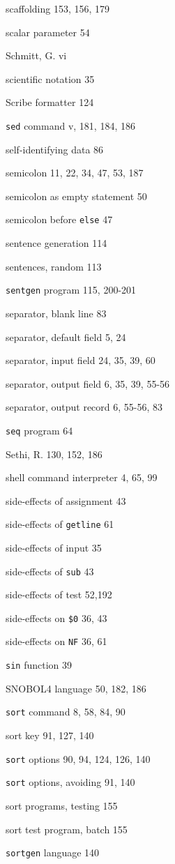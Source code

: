 \begin{multicols}{3}
scaffolding 153, 156, 179

scalar parameter 54

Schmitt, G. vi

scientific notation 35

Scribe formatter 124

\verb'sed' command v, 181, 184, 186

self-identifying data 86

semicolon 11, 22, 34, 47, 53, 187

semicolon as empty statement 50

semicolon before \verb'else' 47

sentence generation 114

sentences, random 113

\verb'sentgen' program 115, 200-201

separator, blank line 83

separator, default field 5, 24

separator, input field 24, 35, 39, 60

separator, output field 6, 35, 39, 55-56

separator, output record 6, 55-56,  83

\verb'seq' program 64

Sethi, R. 130, 152, 186

shell command interpreter 4, 65, 99

side-effects of assignment 43

side-effects of \verb'getline' 61

side-effects of input 35

side-effects of \verb'sub' 43

side-effects of test 52,192

side-effects on \verb'$0' 36, 43

side-effects on \verb'NF' 36, 61

\verb'sin' function 39

SNOBOL4 language 50, 182, 186

\verb'sort' command 8, 58, 84, 90

sort key 91, 127, 140

\verb'sort' options 90, 94, 124, 126, 140

\verb'sort' options, avoiding 91, 140


sort programs, testing 155

sort test program, batch 155

\verb'sortgen' language 140


\end{multicols}

